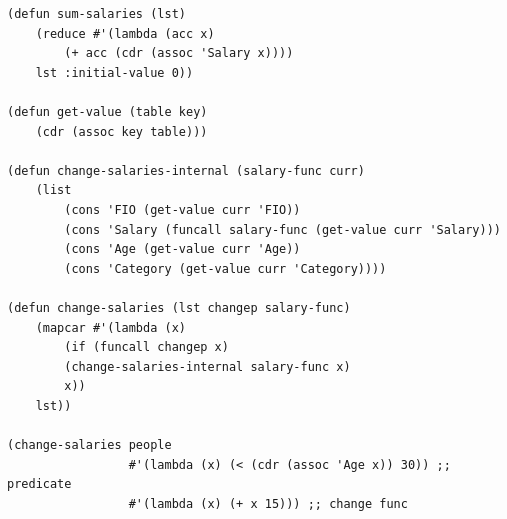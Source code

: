 \documentclass[12pt]{report}
\begin{document}
\begin{lstlisting}
(defun sum-salaries (lst)
	(reduce #'(lambda (acc x)
		(+ acc (cdr (assoc 'Salary x))))
	lst :initial-value 0))

(defun get-value (table key)
	(cdr (assoc key table)))

(defun change-salaries-internal (salary-func curr)
	(list
		(cons 'FIO (get-value curr 'FIO))
		(cons 'Salary (funcall salary-func (get-value curr 'Salary)))
		(cons 'Age (get-value curr 'Age))
		(cons 'Category (get-value curr 'Category))))

(defun change-salaries (lst changep salary-func)
	(mapcar #'(lambda (x)
		(if (funcall changep x)
		(change-salaries-internal salary-func x)
		x))
	lst))

(change-salaries people
				 #'(lambda (x) (< (cdr (assoc 'Age x)) 30)) ;; predicate
				 #'(lambda (x) (+ x 15))) ;; change func
\end{lstlisting}

	
	
	
\end{document}
